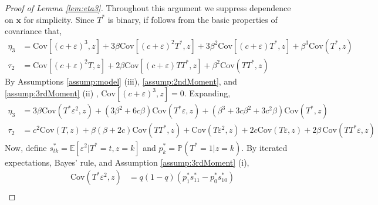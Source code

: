 \documentclass[12pt]{article}
\begin{document}
\begin{proof}[Proof of Lemma \ref{lem:eta3}]
  Throughout this argument we suppress dependence on $\mathbf{x}$ for simplicity.
  Since $T^*$ is binary, if follows from the basic properties of covariance that,
\begin{align*}
  \eta_3 &= \mbox{Cov}\left[ (c + \varepsilon)^3,z \right] + 3 \beta \mbox{Cov}[(c + \varepsilon)^2 T^*, z] + 3 \beta^2 \mbox{Cov}[(c + \varepsilon)T^*,z] + \beta^3 \mbox{Cov}(T^*,z)\\
  \tau_2 &= \mbox{Cov}\left[ (c + \varepsilon)^2 T, z \right] + 2 \beta \mbox{Cov}\left[ (c + \varepsilon)TT^*,z \right] + \beta^2 \mbox{Cov}(TT^*,z)
\end{align*}
By Assumptions \ref{assump:model} (iii), \ref{assump:2ndMoment}, and \ref{assump:3rdMoment} (ii) , $\mbox{Cov}\left[ (c + \varepsilon)^3,z \right] = 0$.
Expanding, 
\begin{align*}
  \eta_3 %
  &= 3 \beta \mbox{Cov}(T^*\varepsilon^2,z) + \left(3 \beta^2 + 6c\beta \right)\mbox{Cov}(T^*\varepsilon,z) + \left( \beta^3 + 3c\beta^2 + 3c^2\beta \right)\mbox{Cov}(T^*, z)\\
  \tau_2 &= c^2 \mbox{Cov}(T,z) + \beta(\beta + 2c) \mbox{Cov}(TT^*,z) + \mbox{Cov}(T\varepsilon^2,z) + 2c \mbox{Cov}(T\varepsilon,z) + 2\beta\,\mbox{Cov}(TT^*\varepsilon,z)
\end{align*}
Now, define $s^*_{tk} = \mathbb{E}[\varepsilon^2|T^*=t, z=k]$ and $p_k^* = \mathbb{P}(T^*=1|z=k)$.
By iterated expectations, Bayes' rule, and Assumption \ref{assump:3rdMoment} (i), 
\begin{align*}
  \mbox{Cov}(T^*\varepsilon^2, z) %
  &= q(1 - q)(p^*_1 s^*_{11} - p^*_0 s^*_{10}) \\

\end{align*}
\end{proof}
\end{document}
